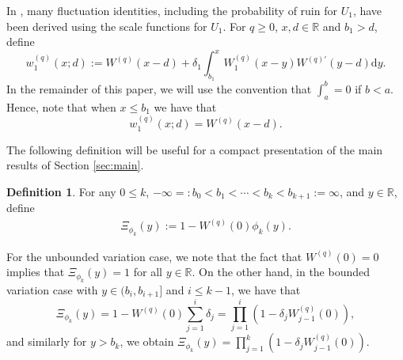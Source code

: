 \documentclass[12pt,reqno]{amsart}
\newcommand{\red}{\textcolor[rgb]{1.00,0.00,0.00}}
\newcommand{\blue}{\textcolor[rgb]{0.00,0.00,1.00}}
\theoremstyle{definition}
\newtheorem{defi}[theorem]{Definition}
\theoremstyle{remark}
\newcommand{\reals}{\mathbb{R}}
\newcommand{\md}{\mathrm{d}}
\begin{document}
In \cite{kyprianouloeffen2010}, many fluctuation identities, including the probability of ruin for $U_1$, have been derived
using the scale functions for $U_1$. For $q \geq 0$, $x,d\in \reals$ and $b_1>d$, define
\begin{equation}\label{small w}
w_1^{\left(q\right)}(x;d) := W^{\left(q\right)}(x-d) + \delta_1\int^{x}_{b_1}W_1^{\left(q\right)}(x-y)W^{\left(q\right)'}(y-d)\md y .
\end{equation} 
In the remainder of this paper, we will use the convention that $\int_a^b=0$ if $b<a$. 
Hence, note that when $x \leq b_1$ we have that
\begin{equation}\label{w_1}
w_1^{\left(q\right)}(x;d)=W^{\left(q\right)}(x-d) .
\end{equation}

The following definition will be useful for a compact presentation of the main results of Section \ref{sec:main}. 

\begin{defi}\label{Delta}
For any $0 \leq k$, $-\infty =: b_0 < b_1 < \cdots < b_k<b_{k+1} :=\infty$, and $y\in\mathbb{R}$, define
\begin{align*}
\Xi_{\phi_k}(y) := 1- W^{(q)}(0)\phi_k(y).
\end{align*}

For the unbounded variation case, we note that the fact that $W^{(q)}(0)=0$ implies that $\Xi_{\phi_k}(y)=1$ for all $y\in\mathbb{R}$. 
On the other hand, in the bounded variation case with $y\in(b_i,b_{i+1}]$ and $i\leq k-1$, we have that
	\[
	\Xi_{\phi_k}(y)=1- W^{(q)}(0)\sum_{j=1}^i\delta_j=\prod_{j=1}^{i} \left(1-\delta_j W_{j-1}^{(q)}(0)\right),
	\]
and similarly for $y>b_k$,	we obtain $\Xi_{\phi_k}(y)=\prod_{j=1}^{k} \left(1-\delta_j W_{j-1}^{(q)}(0)\right)$.
	\end{defi}
\end{document}
